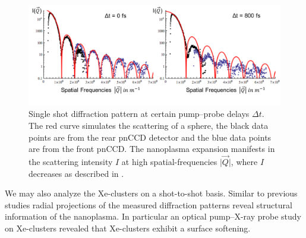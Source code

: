 \begin{figure}
	\centering
		\includegraphics[width=1.0\textwidth]{images/results/Xe-diff-pattern.png}
	\caption[Single-shot diffraction pattern of Xe-cluster at varying time delays]{Single shot diffraction pattern at certain pump--probe delays $\Delta t$. The red curve simulates the scattering of a sphere, the black data points are from the rear pnCCD detector and the blue data points are from the front pnCCD. The nanoplasma expansion manifests in the scattering intensity $I$ at high spatial-frequencies $\lvert \vec{Q}\rvert$, where $I$ decreases as described in \citep{Gorkhover-2016-NatPho}.}
	\label{fig:Xe-only-diff-pattern}
\end{figure}
We may also analyze the Xe-clusters on a shot-to-shot basis. Similar to previous studies \cite{Gorkhover-2016-NatPho,Rupp-2016-Springer,Bostedt-2012-PRL} radial projections of the measured diffraction patterns reveal structural information of the nanoplasma. In particular an optical pump--X-ray probe study on Xe-clusters \cite{Gorkhover-2016-NatPho} revealed that Xe-clusters exhibit a surface softening.
